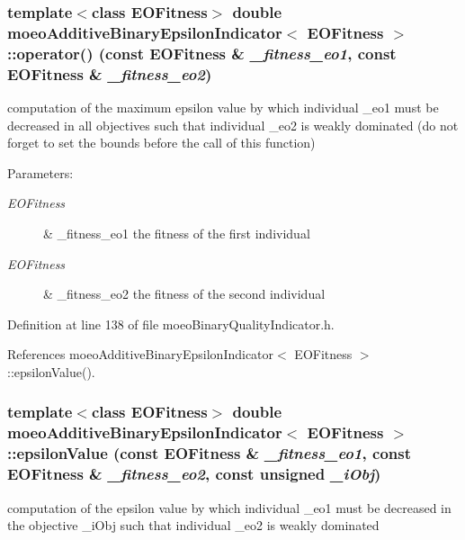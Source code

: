\subsubsection{\setlength{\rightskip}{0pt plus 5cm}template$<$class EOFitness$>$ double {\bf moeo\-Additive\-Binary\-Epsilon\-Indicator}$<$ EOFitness $>$::operator() (const EOFitness \& {\em \_\-fitness\_\-eo1}, const EOFitness \& {\em \_\-fitness\_\-eo2})\hspace{0.3cm}{\tt  [inline]}}\label{classmoeoAdditiveBinaryEpsilonIndicator_177f9999db6c9fb95d5fbff5a157348c}


computation of the maximum epsilon value by which individual \_\-eo1 must be decreased in all objectives such that individual \_\-eo2 is weakly dominated (do not forget to set the bounds before the call of this function) 

\begin{Desc}
\item[Parameters:]
\begin{description}
\item[{\em EOFitness}]\& \_\-fitness\_\-eo1 the fitness of the first individual \item[{\em EOFitness}]\& \_\-fitness\_\-eo2 the fitness of the second individual \end{description}
\end{Desc}


Definition at line 138 of file moeo\-Binary\-Quality\-Indicator.h.

References moeo\-Additive\-Binary\-Epsilon\-Indicator$<$ EOFitness $>$::epsilon\-Value().
\subsubsection{\setlength{\rightskip}{0pt plus 5cm}template$<$class EOFitness$>$ double {\bf moeo\-Additive\-Binary\-Epsilon\-Indicator}$<$ EOFitness $>$::epsilon\-Value (const EOFitness \& {\em \_\-fitness\_\-eo1}, const EOFitness \& {\em \_\-fitness\_\-eo2}, const unsigned {\em \_\-i\-Obj})\hspace{0.3cm}{\tt  [inline, private]}}\label{classmoeoAdditiveBinaryEpsilonIndicator_e953aa9fe74ebc210dde5ab193c6acab}


computation of the epsilon value by which individual \_\-eo1 must be decreased in the objective \_\-i\-Obj such that individual \_\-eo2 is weakly dominated 

